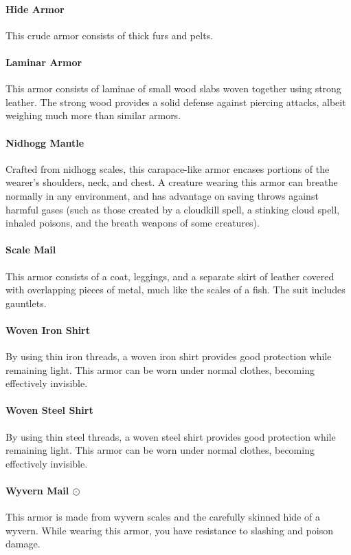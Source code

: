    \paragraph{Hide Armor}
        This crude armor consists of thick furs and pelts.
    \paragraph{Laminar Armor}
        This armor consists of laminae of small wood slabs woven together using strong leather.
        The strong wood provides a solid defense against piercing attacks, albeit weighing much more than similar armors.
    \paragraph{Nidhogg Mantle}
        Crafted from nidhogg scales, this carapace-like armor encases portions of the wearer's shoulders, neck, and chest.
        A creature wearing this armor can breathe normally in any environment, and has advantage on saving throws against harmful gases (such as those created by a cloudkill spell, a stinking cloud spell, inhaled poisons, and the breath weapons of some creatures).
    \paragraph{Scale Mail}
        This armor consists of a coat, leggings, and a separate skirt of leather covered with overlapping pieces of metal, much like the scales of a fish.
        The suit includes gauntlets.
    \paragraph{Woven Iron Shirt}
        By using thin iron threads, a woven iron shirt provides good protection while remaining light.
        This armor can be worn under normal clothes, becoming effectively invisible.
    \paragraph{Woven Steel Shirt}
        By using thin steel threads, a woven steel shirt provides good protection while remaining light.
        This armor can be worn under normal clothes, becoming effectively invisible.
    \paragraph{Wyvern Mail $\odot$}
        This armor is made from wyvern scales and the carefully skinned hide of a wyvern.
        While wearing this armor, you have resistance to slashing and poison damage.
